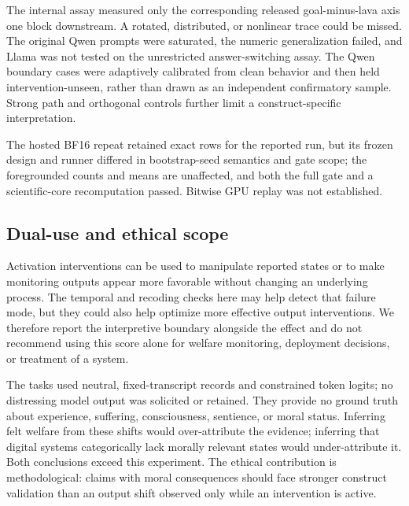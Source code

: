 \documentclass[10pt,twocolumn]{article}
\begin{document}
The internal assay measured only the corresponding released goal-minus-lava axis one block downstream. A rotated, distributed, or nonlinear trace could be missed. The original Qwen prompts were saturated, the numeric generalization failed, and Llama was not tested on the unrestricted answer-switching assay. The Qwen boundary cases were adaptively calibrated from clean behavior and then held intervention-unseen, rather than drawn as an independent confirmatory sample. Strong path and orthogonal controls further limit a construct-specific interpretation.

The hosted BF16 repeat retained exact rows for the reported run, but its frozen design and runner differed in bootstrap-seed semantics and gate scope; the foregrounded counts and means are unaffected, and both the full gate and a scientific-core recomputation passed. Bitwise GPU replay was not established.

\subsection{Dual-use and ethical scope}

Activation interventions can be used to manipulate reported states or to make monitoring outputs appear more favorable without changing an underlying process. The temporal and recoding checks here may help detect that failure mode, but they could also help optimize more effective output interventions. We therefore report the interpretive boundary alongside the effect and do not recommend using this score alone for welfare monitoring, deployment decisions, or treatment of a system.

The tasks used neutral, fixed-transcript records and constrained token logits; no distressing model output was solicited or retained. They provide no ground truth about experience, suffering, consciousness, sentience, or moral status. Inferring felt welfare from these shifts would over-attribute the evidence; inferring that digital systems categorically lack morally relevant states would under-attribute it. Both conclusions exceed this experiment. The ethical contribution is methodological: claims with moral consequences should face stronger construct validation than an output shift observed only while an intervention is active.
\end{document}
